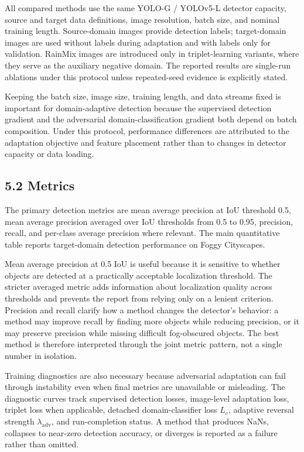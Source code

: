 \documentclass[
  11pt,
]{article}
\begin{document}
All compared methods use the same YOLO-G / YOLOv5-L detector capacity,
source and target data definitions, image resolution, batch size, and
nominal training length. Source-domain images provide detection labels;
target-domain images are used without labels during adaptation and with
labels only for validation. RainMix images are introduced only in
triplet-learning variants, where they serve as the auxiliary negative
domain. The reported results are single-run ablations under this
protocol unless repeated-seed evidence is explicitly stated.

Keeping the batch size, image size, training length, and data streams
fixed is important for domain-adaptive detection because the supervised
detection gradient and the adversarial domain-classification gradient
both depend on batch composition. Under this protocol, performance
differences are attributed to the adaptation objective and feature
placement rather than to changes in detector capacity or data loading.

\hypertarget{metrics}{%
\subsection{5.2 Metrics}\label{metrics}}

The primary detection metrics are mean average precision at IoU
threshold 0.5, mean average precision averaged over IoU thresholds from
0.5 to 0.95, precision, recall, and per-class average precision where
relevant. The main quantitative table reports target-domain detection
performance on Foggy Cityscapes.

Mean average precision at 0.5 IoU is useful because it is sensitive to
whether objects are detected at a practically acceptable localization
threshold. The stricter averaged metric adds information about
localization quality across thresholds and prevents the report from
relying only on a lenient criterion. Precision and recall clarify how a
method changes the detector's behavior: a method may improve recall by
finding more objects while reducing precision, or it may preserve
precision while missing difficult fog-obscured objects. The best method
is therefore interpreted through the joint metric pattern, not a single
number in isolation.

Training diagnostics are also necessary because adversarial adaptation
can fail through instability even when final metrics are unavailable or
misleading. The diagnostic curves track supervised detection losses,
image-level adaptation loss, triplet loss when applicable, detached
domain-classifier loss \(L_c\), adaptive reversal strength
\(\lambda_{\mathrm{adv}}\), and run-completion status. A method that
produces NaNs, collapses to near-zero detection accuracy, or diverges is
reported as a failure rather than omitted.
\end{document}
